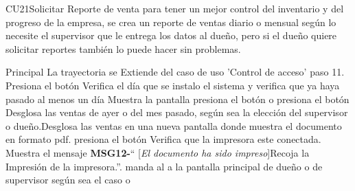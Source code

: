 \begin{UseCase}{CU21}{Solicitar Reporte de venta}{
	para tener un mejor control del inventario y del progreso de la empresa,
	se crea un reporte de ventas diario o mensual según lo necesite el supervisor que le entrega los datos al dueño, pero si el dueño quiere solicitar reportes también lo puede hacer sin problemas.
	}
	\end{UseCase}
	\begin{UCtrayectoria}{Principal}
		\UCpaso La trayectoria se Extiende del caso de uso 'Control de acceso' paso 11.
		\UCpaso [\UCactor] Presiona el botón 
		\UCpaso Verifica el día que se instalo el sistema y verifica que ya haya pasado al menos un día 
		\UCpaso Muestra la pantalla 
		\UCpaso[\UCactor] presiona el botón  o presiona el botón
		\UCpaso Desglosa las ventas de ayer o del mes pasado, según sea la elección del supervisor o dueño.Desglosa las ventas en una nueva pantalla donde muestra el documento en formato pdf.
		\UCpaso [\UCactor] presiona el botón 
		\UCpaso Verifica que la impresora este conectada.
		\UCpaso Muestra el mensaje {\bf MSG12-}`` [{\em El documento ha sido impreso}]Recoja la Impresión de la impresora.''.
		\UCpaso manda al \UCactor a la pantalla principal de dueño o de supervisor
		según sea el caso  o
		
	\end{UCtrayectoria}

